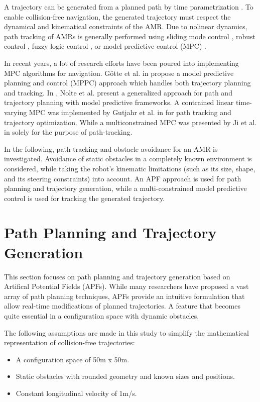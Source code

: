 \documentclass[a4paper, twocolumn]{article}
\begin{document}
A trajectory can be generated from a planned path by time parametrization \cite{roesmann1}. 
To enable collision-free navigation, the generated trajectory must respect the dynamical and kinematical constraints of the AMR.
Due to nolinear dynamics, path tracking of AMRs is generally performed using sliding mode control \cite{yang1}, 
robust control \cite{normey-rico1}, fuzzy logic control \cite{antonelli1}, or model predictive control (MPC) \cite{ji1}.

In recent years, a lot of research efforts have been poured into implementing MPC algorithms for navigation.
Götte et al. in \cite{goette1} propose a model predictive planning and control (MPPC) approach which handles both trajectory planning and tracking.
In \cite{nolte1}, Nolte et al. present a generalized approach for path and trajectory planning with model predictive frameworks.
A contrained linear time-varying MPC was implemented by Gutjahr et al. in \cite{gutjahr1} for path tracking and trajectory optimization.
While a multiconstrained MPC was presented by Ji et al. in \cite{ji1} solely for the purpose of path-tracking.

In the following, path tracking and obstacle avoidance for an AMR is investigated.
Avoidance of static obstacles in a completely known environment is considered, while taking the robot’s kinematic limitations 
(such as its size, shape, and its steering constraints) into account.
An APF approach is used for path planning and trajectory generation, 
while a multi-constrained model predictive control is used for tracking the generated trajectory.


\section{Path Planning and Trajectory Generation}
This section focuses on path planning and trajectory generation based on Artifical Potential Fields (APFs).
While many researchers have proposed a vast array of path planning techniques, APFs provide an intuitive formulation that 
allow real-time modifications of planned trajectories. A feature that becomes quite essential in a configuration space with dynamic obstacles.

The following assumptions are made in this study to simplify the mathematical representation of collision-free trajectories:
\begin{itemize}
    \item A configuration space of 50m x 50m.
    \item Static obstacles with rounded geometry and known sizes and positions.
    \item Constant longitudinal velocity of 1m/s.
\end{itemize}
\end{document}
